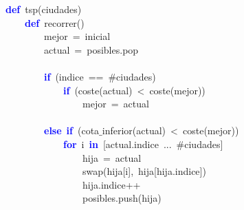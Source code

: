 \noindent
\mbox{}\textbf{\textcolor{Blue}{def}}\ tsp\textcolor{BrickRed}{(}ciudades\textcolor{BrickRed}{)} \\
\mbox{}\ \ \ \ \textbf{\textcolor{Blue}{def}}\ recorrer\textcolor{BrickRed}{()} \\
\mbox{}\ \ \ \ \ \ \ \ mejor\ \textcolor{BrickRed}{=}\ inicial \\
\mbox{}\ \ \ \ \ \ \ \ actual\ \textcolor{BrickRed}{=}\ posibles\textcolor{BrickRed}{.}pop \\
\mbox{} \\
\mbox{}\ \ \ \ \ \ \ \ \textbf{\textcolor{Blue}{if}}\ \textcolor{BrickRed}{(}indice\ \textcolor{BrickRed}{==}\ \#ciudades\textcolor{BrickRed}{)} \\
\mbox{}\ \ \ \ \ \ \ \ \ \ \ \ \textbf{\textcolor{Blue}{if}}\ \textcolor{BrickRed}{(}coste\textcolor{BrickRed}{(}actual\textcolor{BrickRed}{)}\ \textcolor{BrickRed}{\textless{}}\ coste\textcolor{BrickRed}{(}mejor\textcolor{BrickRed}{))} \\
\mbox{}\ \ \ \ \ \ \ \ \ \ \ \ \ \ \ \ mejor\ \textcolor{BrickRed}{=}\ actual \\
\mbox{} \\
\mbox{}\ \ \ \ \ \ \ \ \textbf{\textcolor{Blue}{else}}\ \textbf{\textcolor{Blue}{if}}\ \textcolor{BrickRed}{(}cota$\_$inferior\textcolor{BrickRed}{(}actual\textcolor{BrickRed}{)}\ \textcolor{BrickRed}{\textless{}}\ coste\textcolor{BrickRed}{(}mejor\textcolor{BrickRed}{))} \\
\mbox{}\ \ \ \ \ \ \ \ \ \ \ \ \textbf{\textcolor{Blue}{for}}\ i\ \textbf{\textcolor{Blue}{in}}\ \textcolor{BrickRed}{[}actual\textcolor{BrickRed}{.}indice\ \textcolor{BrickRed}{...}\ \#ciudades\textcolor{BrickRed}{]} \\
\mbox{}\ \ \ \ \ \ \ \ \ \ \ \ \ \ \ \ hija\ \textcolor{BrickRed}{=}\ actual \\
\mbox{}\ \ \ \ \ \ \ \ \ \ \ \ \ \ \ \ swap\textcolor{BrickRed}{(}hija\textcolor{BrickRed}{[}i\textcolor{BrickRed}{],}\ hija\textcolor{BrickRed}{[}hija\textcolor{BrickRed}{.}indice\textcolor{BrickRed}{])} \\
\mbox{}\ \ \ \ \ \ \ \ \ \ \ \ \ \ \ \ hija\textcolor{BrickRed}{.}indice\textcolor{BrickRed}{++} \\
\mbox{}\ \ \ \ \ \ \ \ \ \ \ \ \ \ \ \ posibles\textcolor{BrickRed}{.}push\textcolor{BrickRed}{(}hija\textcolor{BrickRed}{)} \\
\mbox{} \\
